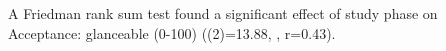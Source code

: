 A Friedman rank sum test found a significant effect of study phase on Acceptance: glanceable (0-100) (\chisq(2)=13.88, , r=0.43). 
